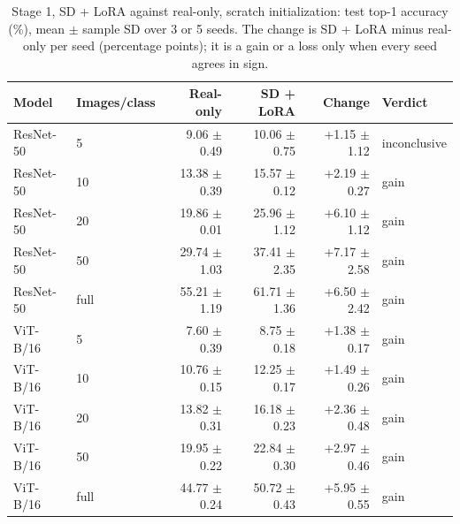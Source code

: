 \begin{table}[H]
\centering
\caption{Stage 1, SD + LoRA against real-only, scratch initialization: test top-1 accuracy (\%), mean $\pm$ sample SD over 3 or 5 seeds. The change is SD + LoRA minus real-only per seed (percentage points); it is a gain or a loss only when every seed agrees in sign.}
\label{tab:stage1-scratch-accuracy-sd_lora-test}
\begin{tabular}{llrrrl}
\toprule
Model & Images/class & Real-only & SD + LoRA & Change & Verdict \\
\midrule
ResNet-50 & 5 & 9.06 $\pm$ 0.49 & 10.06 $\pm$ 0.75 & +1.15 $\pm$ 1.12 & inconclusive \\
ResNet-50 & 10 & 13.38 $\pm$ 0.39 & 15.57 $\pm$ 0.12 & +2.19 $\pm$ 0.27 & gain \\
ResNet-50 & 20 & 19.86 $\pm$ 0.01 & 25.96 $\pm$ 1.12 & +6.10 $\pm$ 1.12 & gain \\
ResNet-50 & 50 & 29.74 $\pm$ 1.03 & 37.41 $\pm$ 2.35 & +7.17 $\pm$ 2.58 & gain \\
ResNet-50 & full & 55.21 $\pm$ 1.19 & 61.71 $\pm$ 1.36 & +6.50 $\pm$ 2.42 & gain \\
\midrule
ViT-B/16 & 5 & 7.60 $\pm$ 0.39 & 8.75 $\pm$ 0.18 & +1.38 $\pm$ 0.17 & gain \\
ViT-B/16 & 10 & 10.76 $\pm$ 0.15 & 12.25 $\pm$ 0.17 & +1.49 $\pm$ 0.26 & gain \\
ViT-B/16 & 20 & 13.82 $\pm$ 0.31 & 16.18 $\pm$ 0.23 & +2.36 $\pm$ 0.48 & gain \\
ViT-B/16 & 50 & 19.95 $\pm$ 0.22 & 22.84 $\pm$ 0.30 & +2.97 $\pm$ 0.46 & gain \\
ViT-B/16 & full & 44.77 $\pm$ 0.24 & 50.72 $\pm$ 0.43 & +5.95 $\pm$ 0.55 & gain \\
\bottomrule
\end{tabular}
\end{table}
